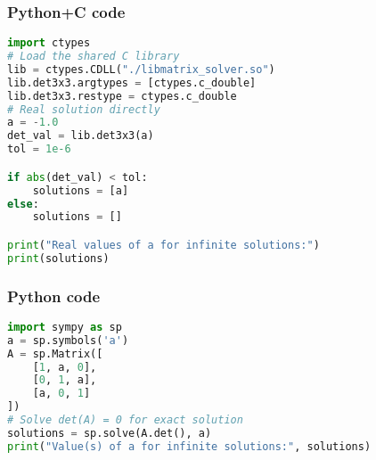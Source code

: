\documentclass{beamer}
\begin{document}
\begin{frame}[fragile]
    \frametitle{Python+C code}

    \begin{lstlisting}[language=Python]
import ctypes
# Load the shared C library
lib = ctypes.CDLL("./libmatrix_solver.so")
lib.det3x3.argtypes = [ctypes.c_double]
lib.det3x3.restype = ctypes.c_double
# Real solution directly
a = -1.0
det_val = lib.det3x3(a)
tol = 1e-6

if abs(det_val) < tol:
    solutions = [a]
else:
    solutions = []

print("Real values of a for infinite solutions:")
print(solutions)


    \end{lstlisting}
\end{frame}

\begin{frame}[fragile]
    \frametitle{Python code}
    \begin{lstlisting}[language=Python]
import sympy as sp
a = sp.symbols('a')
A = sp.Matrix([
    [1, a, 0],
    [0, 1, a],
    [a, 0, 1]
])
# Solve det(A) = 0 for exact solution
solutions = sp.solve(A.det(), a)
print("Value(s) of a for infinite solutions:", solutions) 
    \end{lstlisting}   
\end{frame}
\end{document}
